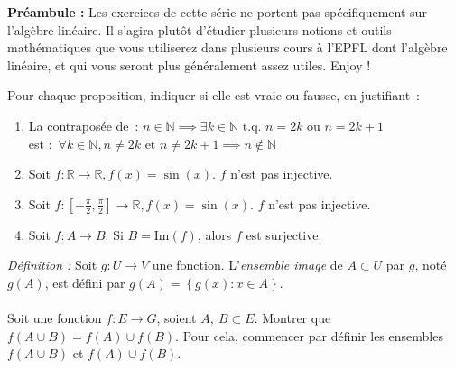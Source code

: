 \begin{center}
\begin{tcolorbox}[boxrule=0pt,frame empty,width=\textwidth]
\textbf{Préambule :} Les exercices de cette série ne portent pas spécifiquement sur l'algèbre linéaire. Il s'agira plutôt d'étudier plusieurs notions et outils mathématiques que vous utiliserez dans plusieurs cours à l'EPFL dont l'algèbre linéaire, et qui vous seront plus généralement assez utiles. Enjoy !
\end{tcolorbox}
\end{center}



\begin{exercice}

Pour chaque proposition, indiquer si elle est vraie ou fausse, en justifiant~:

\begin{enumerate}
    \item La contraposée de~: $n \in \mathbb N \implies \exists k \in \mathbb N \text{ t.q. } n=2k \text { ou } n=2k+1$ \\
    est $:$ $\forall k \in \mathbb N, n \not= 2k \text { et } n\not= 2k+1 \implies n \not\in \mathbb N$

    \item Soit $f: \mathbb R \rightarrow \mathbb R, f(x) = \sin(x)$. $f$ n'est pas injective.

    \item Soit $f: \left[-\frac \pi 2, \frac \pi 2\right] \rightarrow \mathbb R, f(x) = \sin(x)$. $f$ n'est pas injective.

    \item Soit $f: A \rightarrow B$. Si $B = \text{Im}(f)$, alors $f$ est surjective.\\
\end{enumerate}

\end{exercice}


\begin{exercice}

\textit{Définition :} Soit $g:U\rightarrow V$ une fonction. L'\textit{ensemble image} de $A \subset U$ par $g$, noté $g(A)$, est défini par $g(A) = \left\{g(x) : x \in A \right\}$.\\ \\
Soit une fonction $f:E\rightarrow G$, soient $A,\ B \subset E$. Montrer que $f(A \cup B) = f(A)\cup f(B)$. Pour cela, commencer par définir les ensembles $f(A \cup B)$ et $f(A)\cup f(B)$. \\
\end{exercice}


